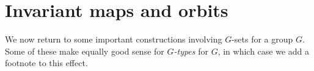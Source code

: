 






\section{Invariant maps and orbits}
\label{sec:fixpts-orbits}
We now return to some important constructions involving $G$-sets 
for a group $G$.
Some of these make equally good sense for \emph{$G$-types} for \aninftygp
$G$, in which case we add a footnote to this effect.

